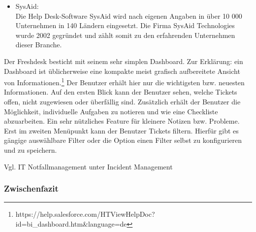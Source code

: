 \begin{itemize}
\item SysAid:\\
		 Die Help Desk-Software SysAid wird nach eigenen Angaben in über 10 000 Unternehmen in 
		 140 Ländern eingesetzt. Die Firma SysAid Technologies wurde 2002 gegründet und zählt somit 
		 zu den erfahrenden Unternehmen dieser Branche.
		\\
\end{itemize}	

\noindent
Der Freshdesk besticht mit seinem sehr simplen Dashboard. Zur Erklärung: ein Dashboard ist üblicherweise eine kompakte meist grafisch aufbereitete Ansicht von Informationen.\footnote{https://help.salesforce.com/HTViewHelpDoc?id=bi_dashboard.htm&language=de} Der Benutzer erhält hier nur die wichtigsten bzw. neuesten Informationen. Auf den ersten Blick kann der Benutzer sehen, welche Tickets offen, nicht zugewiesen oder überfällig sind. Zusätzlich erhält der Benutzer die Möglichkeit, individuelle Aufgaben zu notieren und wie eine Checkliste abzuarbeiten. Ein sehr nützliches Feature für kleinere Notizen bzw. Probleme. Erst im zweiten Menüpunkt kann der Benutzer Tickets filtern. Hierfür gibt es gängige auswählbare Filter oder die Option einen Filter selbst zu konfigurieren und zu speichern.

\noindent
Vgl. IT Notfallmanagement unter Incident Management


\subsubsection{Zwischenfazit}